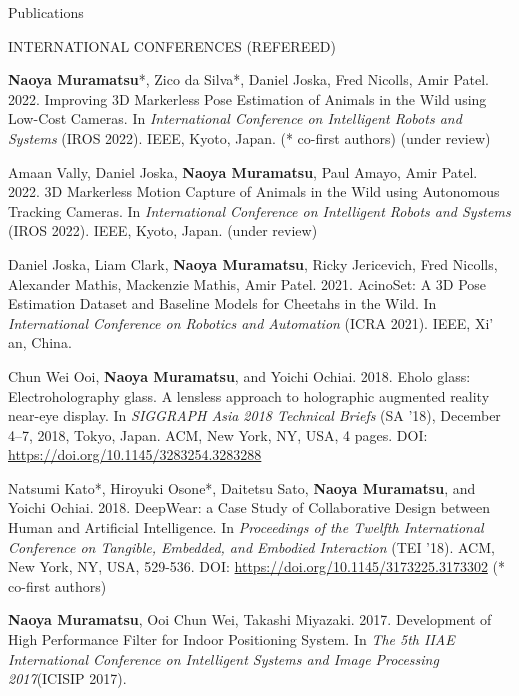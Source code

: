 \documentclass{resume} %
\begin{document}
\begin{rSection}{Publications}
    \begin{rSubsection}{INTERNATIONAL CONFERENCES (REFEREED)}{}{}{}{}
        \item \textbf{Naoya Muramatsu}*, Zico da Silva*, Daniel Joska, Fred Nicolls, Amir Patel. 2022. Improving 3D Markerless Pose Estimation of Animals in the Wild using Low-Cost Cameras. In \textit{International Conference on Intelligent Robots and Systems} (IROS 2022). IEEE, Kyoto, Japan. (* co-first authors) (under review)
        \item Amaan Vally, Daniel Joska, \textbf{Naoya Muramatsu}, Paul Amayo, Amir Patel. 2022. 3D Markerless Motion Capture of Animals in the Wild using Autonomous Tracking Cameras. In \textit{International Conference on Intelligent Robots and Systems} (IROS 2022). IEEE, Kyoto, Japan. (under review)
        \item Daniel Joska, Liam Clark, \textbf{Naoya Muramatsu}, Ricky Jericevich, Fred Nicolls, Alexander Mathis, Mackenzie Mathis, Amir Patel. 2021. AcinoSet: A 3D Pose Estimation Dataset and Baseline Models for Cheetahs in the Wild. In \textit{International Conference on Robotics and Automation} (ICRA 2021). IEEE, Xi' an, China.
        \item Chun Wei Ooi, \textbf{Naoya Muramatsu}, and Yoichi Ochiai. 2018. Eholo glass: Electroholography glass. A lensless approach to holographic augmented reality near-eye display. In \textit{SIGGRAPH Asia 2018 Technical Briefs} (SA ’18), December 4–7, 2018, Tokyo, Japan. ACM, New York, NY, USA, 4 pages. DOI: \url{https://doi.org/10.1145/3283254.3283288}
        \item Natsumi Kato*, Hiroyuki Osone*, Daitetsu Sato, \textbf{Naoya Muramatsu}, and Yoichi Ochiai. 2018. DeepWear: a Case Study of Collaborative Design between Human and Artificial Intelligence. In \textit{Proceedings of the Twelfth International Conference on Tangible, Embedded, and Embodied Interaction} (TEI ’18). ACM, New York, NY, USA, 529-536. DOI: \url{https://doi.org/10.1145/3173225.3173302} (* co-first authors)
        \item \textbf{Naoya Muramatsu}, Ooi Chun Wei, Takashi Miyazaki. 2017. Development of High Performance Filter for Indoor Positioning System. In \textit{The 5th IIAE International Conference on Intelligent Systems and Image Processing 2017}(ICISIP 2017).
    \end{rSubsection}


\end{rSection}
\end{document}
